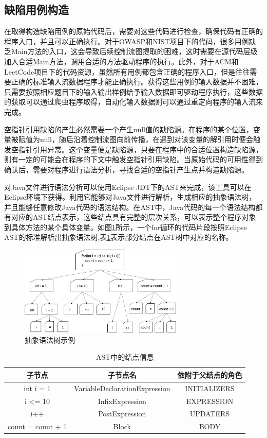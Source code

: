 \subsection{缺陷用例构造}
在取得构造缺陷用例的原始代码后，需要对这些代码进行检查，确保代码有正确的程序入口，并且可以正确执行。对于OWASP和NIST项目下的代码，很多用例缺乏Main方法的入口，这会导致后续控制流图提取的困难，这时需要在源代码层级加入合适Main方法，调用合适的方法驱动程序的执行。此外，对于ACM和LeetCode项目下的代码资源，虽然所有用例都包含正确的程序入口，但是往往需要正确的标准输入流数据程序才能正确执行。获得这些用例的输入数据并不困难，只需要按照相应题目下的输入输出样例给予输入数据即可驱动程序执行，这些数据的获取可以通过爬虫程序取得，自动化输入数据则可以通过重定向程序的输入流来完成。

空指针引用缺陷的产生必然需要一个产生null值的缺陷源。在程序的某个位置，变量被赋值为null，随后沿着控制流图向前传播，在遇到对该变量的解引用时便会触发空指针引用异常。这个变量便是缺陷源，只要在程序中的合适位置构造缺陷源，则有一定的可能会在程序的下文中触发空指针引用缺陷。当原始代码的可用性得到确认后，需要对程序进行语法分析，寻找合适的空指针产生点并构造缺陷源。

对Java文件进行语法分析可以使用Eclipse JDT下的AST来完成，该工具可以在Eclipse环境下获得。利用它能够对Java文件进行解析，生成相应的抽象语法树，并且能够任意修改Java代码的语法结构。在AST中，Java代码的每一个语法结构都有对应的AST结点表示，这些结点具有完整的层次关系，可以表示整个程序对象到具体方法的某个具体变量。如图\ref{fig:figure4-2}所示，一个for循环的代码片段按照Eclipse AST的标准解析出抽象语法树,表\ref{tab:table4-1}表示部分结点在AST树中对应的名称。

\begin{figure}
	\centering
	\includegraphics[width=0.70\textwidth]{figures/ast4-2}
	\caption{抽象语法树示例}\label{fig:figure4-2}
\end{figure}

\begin{table}
	\centering
	\caption{AST中的结点信息} \label{tab:table4-1}
	\begin{tabular*}{0.9\textwidth}{@{\extracolsep{\fill}}ccc}
		\toprule
		子节点	&子节点名	&依附于父结点的角色 \\
		\midrule
		int i = 1	&VariableDeclarationExpression	&INITIALIZERS \\
		i <= 10	&InfixExpression	&EXPRESSION \\
		i++	&PostExpression	&UPDATERS \\
		{ count = count + 1 }	&Block	&BODY \\
		\bottomrule
	\end{tabular*}
\end{table}

